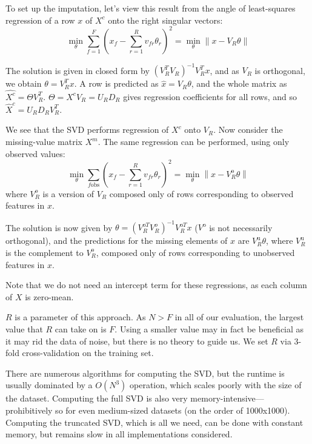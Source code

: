 To set up the imputation, let's view this result from the angle of least-squares regression of a row $x$ of $X^c$ onto the right singular vectors:
\begin{equation} \label{eq:svd_regression}
\min_\theta \sum_{f=1}^F (x_f - \sum_{r=1}^R v_{fr} \theta_r )^2 = \min_\theta \left\| x - V_R \theta \right\|
\end{equation}

The solution is given in closed form by $\left( V_R^T V_R \right)^{-1} V_R^T x$, and as $V_R$ is orthogonal, we obtain $\theta = V_R^T x$.
A row is predicted as $\hat{x} = V_R \theta$, and the whole matrix as $\hat{X^c} = \Theta V_R^T$.
$\Theta = X^c V_R = U_R D_R$ gives regression coefficients for all rows, and so $\hat{X}^c = U_R D_R V_R^T$.

We see that the SVD performs regression of $X^c$ onto $V_R$.
Now consider the missing-value matrix $X^m$.
The same regression can be performed, using only observed values:
\begin{equation}
\min_\theta \sum_{f \text{obs}} (x_f - \sum_{r=1}^R v_{fr} \theta_r )^2 = \min_\theta \left\| x - V_R^\text{o} \theta \right\|
\end{equation}
where $V_R^o$ is a version of $V_R$ composed only of rows corresponding to observed features in $x$.

The solution is now given by $\theta = \left( V_R^{\text{o}T} V_R^o \right)^{-1} V_R^{\text{o}T} x$ ($V^\text{o}$ is not necessarily orthogonal), and the predictions for the missing elements of $x$ are $V_R^\text{u} \theta$, where $V_R^\text{u}$ is the complement to $V_R^\text{o}$, composed only of rows corresponding to unobserved features in $x$.

Note that we do not need an intercept term for these regressions, as each column of $X$ is zero-mean.

$R$ is a parameter of this approach.
As $N > F$ in all of our evaluation, the largest value that $R$ can take on is $F$.
Using a smaller value may in fact be beneficial as it may rid the data of noise, but there is no theory to guide us.
We set $R$ via 3-fold cross-validation on the training set.

There are numerous algorithms for computing the SVD, but the runtime is usually dominated by a $O(N^3)$ operation, which scales poorly with the size of the dataset.
Computing the full SVD is also very memory-intensive---prohibitively so for even medium-sized datasets (on the order of 1000x1000).
Computing the truncated SVD, which is all we need, can be done with constant memory, but remains slow in all implementations considered.

